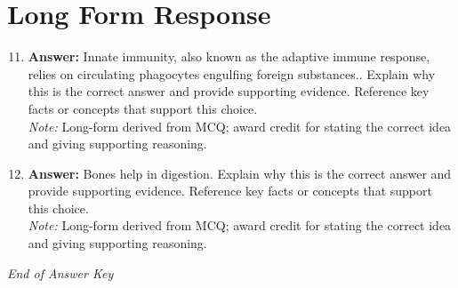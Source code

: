 \documentclass[12pt]{article}
\begin{document}
\section*{Long Form Response}
\begin{enumerate}[label=\arabic*.]
\setcounter{enumi}{10}
\item \textbf{Answer:} Innate immunity, also known as the adaptive immune response, relies on circulating phagocytes engulfing foreign substances.. Explain why this is the correct answer and provide supporting evidence. Reference key facts or concepts that support this choice.
\\ \textit{Note:} Long-form derived from MCQ; award credit for stating the correct idea and giving supporting reasoning.
\item \textbf{Answer:} Bones help in digestion. Explain why this is the correct answer and provide supporting evidence. Reference key facts or concepts that support this choice.
\\ \textit{Note:} Long-form derived from MCQ; award credit for stating the correct idea and giving supporting reasoning.
\end{enumerate}

\vfill
\noindent\textit{End of Answer Key}
\end{document}
